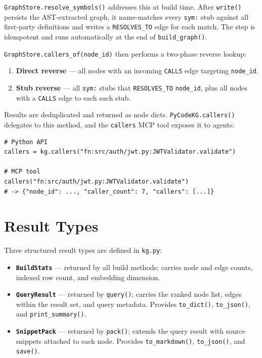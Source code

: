 \documentclass[10pt]{article}
\begin{document}
\texttt{GraphStore.resolve\_sym\-bols()} addresses this at build time. After
\texttt{write()} persists the AST-extracted graph, it name-matches every
\texttt{sym:} stub against all first-party definitions and writes a
\texttt{RESOLVES\_TO} edge for each match. The step is idempotent and runs
automatically at the end of \texttt{build\_graph()}.

\texttt{GraphStore.callers\_of(node\_id)} then performs a two-phase reverse lookup:

\begin{enumerate}
\item \textbf{Direct reverse} --- all nodes with an incoming \texttt{CALLS}
edge targeting \texttt{node\_id}.
\item \textbf{Stub reverse} --- all \texttt{sym:} stubs that \texttt{RESOLVES\_TO}
\texttt{node\_id}, plus all nodes with a \texttt{CALLS} edge to each such stub.
\end{enumerate}

Results are deduplicated and returned as node dicts. \texttt{PyCodeKG.callers()}
delegates to this method, and the \texttt{callers} MCP tool exposes it to agents:

\begin{lstlisting}
# Python API
callers = kg.callers("fn:src/auth/jwt.py:JWTValidator.validate")

# MCP tool
callers("fn:src/auth/jwt.py:JWTValidator.validate")
# -> {"node_id": ..., "caller_count": 7, "callers": [...]}
\end{lstlisting}

\section{Result Types}

Three structured result types are defined in \texttt{kg.py}:

\begin{itemize}
\item \textbf{\texttt{BuildStats}} --- returned by all build methods; carries node
and edge counts, indexed row count, and embedding dimension.
\item \textbf{\texttt{QueryResult}} --- returned by \texttt{query()}; carries the
ranked node list, edges within the result set, and query metadata. Provides
\texttt{to\_dict()}, \texttt{to\_json()}, and \texttt{print\_summary()}.
\item \textbf{\texttt{SnippetPack}} --- returned by \texttt{pack()}; extends the
query result with source snippets attached to each node. Provides
\texttt{to\_markdown()}, \texttt{to\_json()}, and \texttt{save()}.
\end{itemize}
\end{document}
